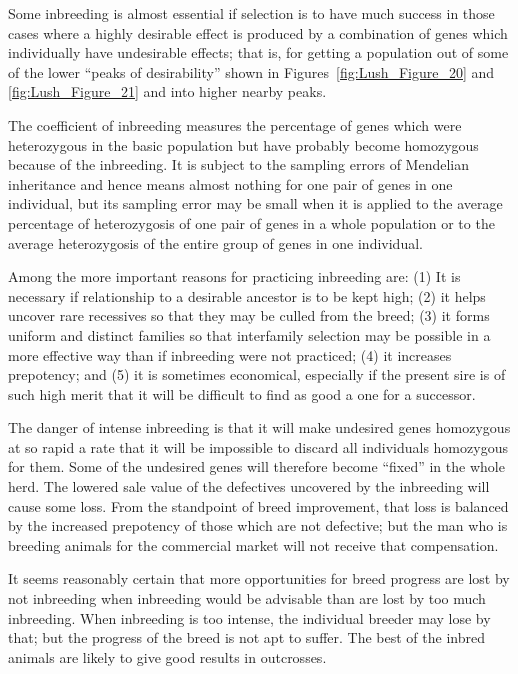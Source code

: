 Some inbreeding is almost essential if selection is to have much success
in those cases where a highly desirable effect is produced by a combination
of genes which individually have undesirable effects; that is,
for getting a population out of some of the lower ``peaks of desirability''
shown in Figures~\ref{fig:Lush_Figure_20} and \ref{fig:Lush_Figure_21} and
into higher nearby peaks.

The coefficient of inbreeding measures the percentage of genes
which were heterozygous in the basic population but have probably
become homozygous because of the inbreeding. It is subject to the sampling
errors of Mendelian inheritance and hence means almost nothing
for one pair of genes in one individual, but its sampling error may be
small when it is applied to the average percentage of heterozygosis of
one pair of genes in a whole population or to the average heterozygosis
of the entire group of genes in one individual.

Among the more important reasons for practicing inbreeding are:
(1) It is necessary if relationship to a desirable ancestor is to be kept
high; (2) it helps uncover rare recessives so that they may be culled from
the breed; (3) it forms uniform and distinct families so that interfamily
selection may be possible in a more effective way than if inbreeding
were not practiced; (4) it increases prepotency; and (5) it is sometimes
economical, especially if the present sire is of such high merit that it
will be difficult to find as good a one for a successor.

The danger of intense inbreeding is that it will make undesired
genes homozygous at so rapid a rate that it will be impossible to discard
all individuals homozygous for them. Some of the undesired genes will
therefore become ``fixed'' in the whole herd. The lowered sale value of
the defectives uncovered by the inbreeding will cause some loss. From
the standpoint of breed improvement, that loss is balanced by the
increased prepotency of those which are not defective; but the man who
is breeding animals for the commercial market will not receive that
compensation.

It seems reasonably certain that more opportunities for breed progress
are lost by not inbreeding when inbreeding would be advisable
than are lost by too much inbreeding. When inbreeding is too intense,
the individual breeder may lose by that; but the progress of the breed
is not apt to suffer. The best of the inbred animals are likely to give
good results in outcrosses.


